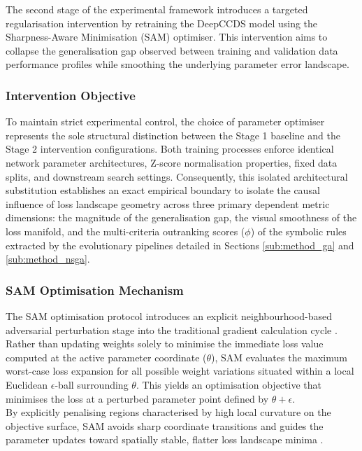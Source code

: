 \label{sub:method_sam}
The second stage of the experimental framework introduces a targeted regularisation 
intervention by retraining the DeepCCDS model using the Sharpness-Aware Minimisation 
(SAM) optimiser. This intervention aims to collapse the generalisation gap observed 
between training and validation data performance profiles while smoothing the 
underlying parameter error landscape.

\subsubsection{Intervention Objective}
\label{ssub:method_sam_objective}
To maintain strict experimental control, the choice of parameter optimiser represents 
the sole structural distinction between the Stage 1 baseline and the Stage 2 intervention 
configurations. Both training processes enforce identical network parameter architectures, 
Z-score normalisation properties, fixed data splits, and downstream search settings. 
Consequently, this isolated architectural substitution establishes an exact empirical 
boundary to isolate the causal influence of loss landscape geometry across three primary 
dependent metric dimensions: the magnitude of the generalisation gap, the visual 
smoothness of the loss manifold, and the multi-criteria outranking scores ($\phi$) of 
the symbolic rules extracted by the evolutionary pipelines detailed in 
Sections \ref{sub:method_ga} and \ref{sub:method_nsga}.

\subsubsection{SAM Optimisation Mechanism}
\label{ssub:method_sam_mechanism}
The SAM optimisation protocol introduces an explicit neighbourhood-based adversarial 
perturbation stage into the traditional gradient calculation cycle \cite{Foret2021}. 
Rather than updating weights solely to minimise the immediate loss value computed at 
the active parameter coordinate ($\theta$), SAM evaluates the maximum worst-case loss 
expansion for all possible weight variations situated within a local Euclidean 
$\epsilon$-ball surrounding $\theta$. This yields an optimisation objective that 
minimises the loss at a perturbed parameter point defined by $\theta + \epsilon$. 
\\
By explicitly penalising regions characterised by high local curvature on the objective 
surface, SAM avoids sharp coordinate transitions and guides the parameter updates toward 
spatially stable, flatter loss landscape minima \cite{Foret2021, Li2018}.

